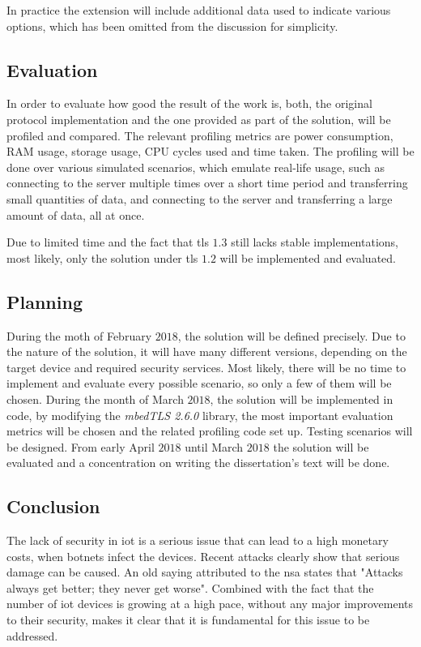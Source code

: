 \documentclass{llncs}
\begin{document}
In practice the extension will include additional data used to indicate various options, which has been omitted from the discussion for simplicity.


\subsection{Evaluation}

In order to evaluate how good the result of the work is, both, the original protocol
implementation and the one provided as part of the solution, will be profiled and compared. The relevant profiling metrics are power consumption, RAM usage, storage usage,
CPU cycles used and time taken. The profiling
will be done over various simulated scenarios, which emulate real-life usage,
such as connecting to the server multiple times over a short time period and transferring
small quantities of data, and connecting to the server and transferring a large
amount of data, all at once.

Due to limited time and the fact that \gls{tls} $1.3$ still lacks stable implementations, most likely, only the solution under \gls{tls} $1.2$ will be implemented and evaluated.

\subsection{Planning}

During the moth of February $2018$, the solution will be defined precisely.
Due to the nature of the solution, it will have many different versions, depending
on the target device and required security services. Most likely, there will be no time
to implement and evaluate every possible scenario, so only a few of them will be chosen.
During the month of March $2018$, the solution will be implemented in code, by modifying
the \textit{mbedTLS 2.6.0} library\cite{SSLLibra13:online}, the most important evaluation metrics will be chosen and the related profiling code set up. Testing scenarios will be designed.
From early April $2018$ until March $2018$ the solution will be evaluated and a concentration on writing the dissertation's text will be done.

\subsection{Conclusion}

The lack of security in \gls{iot} is a serious issue that can lead to a high monetary costs,
when botnets infect the devices. Recent
attacks clearly show that serious damage can be caused. An old saying attributed to the
\gls{nsa} states that "Attacks always get better; they never get worse".
Combined with the fact that the number of \gls{iot} devices is growing at a high
pace, without any major improvements to their security, makes it clear
that it is fundamental for this issue to be addressed.
\end{document}
